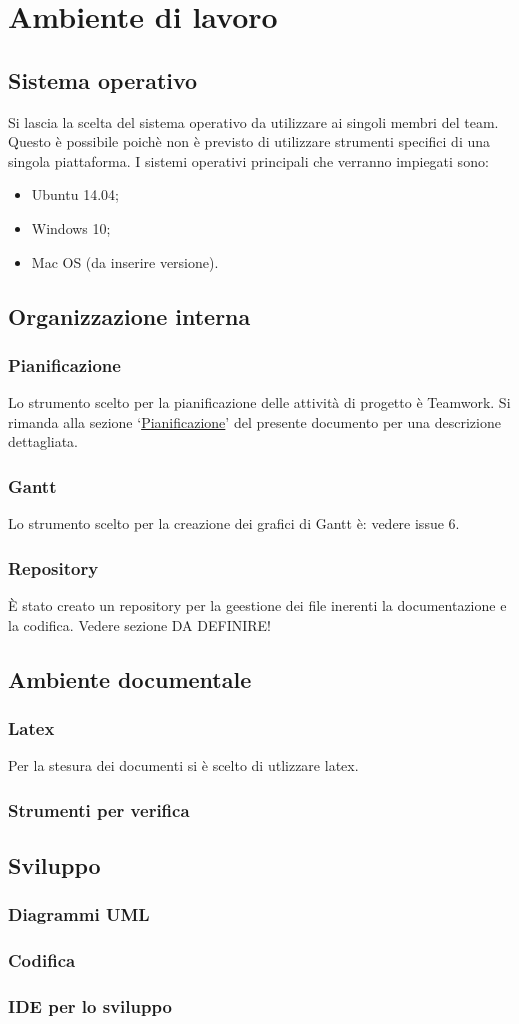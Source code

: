 \documentclass[../NormeProgetto.tex]{subfiles}
\begin{document}
	\section{Ambiente di lavoro}
		\subsection{Sistema operativo}
		Si lascia la scelta del sistema operativo da utilizzare ai singoli membri del team. Questo è possibile poichè non è previsto di utilizzare strumenti specifici di una singola piattaforma. I sistemi operativi principali che verranno impiegati sono:
		\begin{itemize}
			\item Ubuntu 14.04;
			\item Windows 10;
			\item Mac OS (da inserire versione).
		\end{itemize}
		
		\subsection{Organizzazione interna}
			\subsubsection{Pianificazione}
			Lo strumento scelto per la pianificazione delle attività di progetto è Teamwork. Si rimanda alla sezione `\hyperref[sec: Pianificazione Teamwork]{Pianificazione}' del presente documento per una descrizione dettagliata.
			\subsubsection{Gantt}
			Lo strumento scelto per la creazione dei grafici di Gantt è: vedere issue 6.
			\subsubsection{Repository}
			È stato creato un repository per la geestione dei file inerenti la documentazione e la codifica. Vedere sezione DA DEFINIRE!
		\subsection{Ambiente documentale}
			\subsubsection{Latex}
			Per la stesura dei documenti si è scelto di utlizzare latex. 
			\subsubsection{Strumenti per verifica}
		\subsection{Sviluppo}
			\subsubsection{Diagrammi UML}
		\subsubsection{Codifica}
			\subsubsection{IDE per lo sviluppo}
\end{document}
